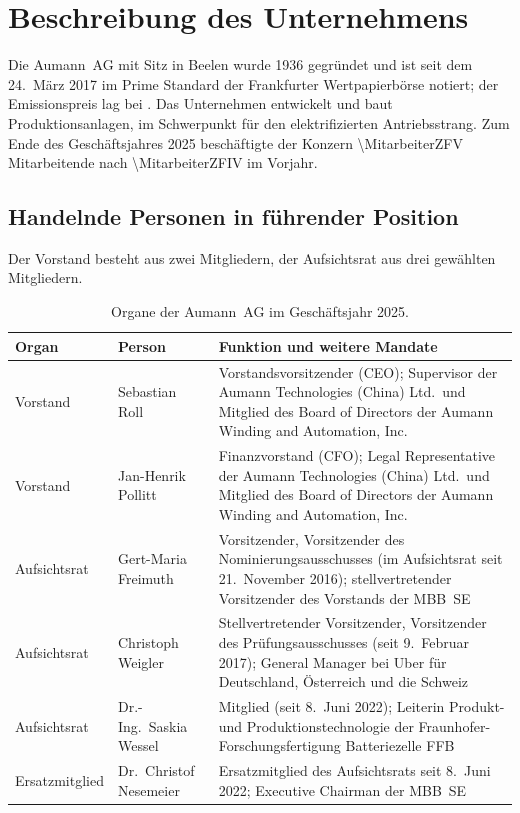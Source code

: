 \section{Beschreibung des Unternehmens}
\label{sec:unternehmen}

Die Aumann~AG mit Sitz in Beelen wurde 1936 gegr\"undet und ist seit
dem 24.~M\"arz 2017 im Prime Standard der Frankfurter Wertpapierb\"orse
notiert; der Emissionspreis lag bei
\EURje{\IPOKurs}.
Das Unternehmen entwickelt und baut Produktionsanlagen, im Schwerpunkt f\"ur
den elektrifizierten Antriebsstrang. Zum Ende des Gesch\"aftsjahres 2025
besch\"aftigte der Konzern \num{\MitarbeiterZFV} Mitarbeitende nach
\num{\MitarbeiterZFIV} im Vorjahr.

\subsection{Handelnde Personen in f\"uhrender Position}
\label{subsec:organe}

Der Vorstand besteht aus zwei Mitgliedern, der Aufsichtsrat aus drei
gew\"ahlten Mitgliedern.

\begin{table}[htbp]
\centering
\caption{Organe der Aumann~AG im Gesch\"aftsjahr 2025.}
\label{tab:organe}
\begin{tabularx}{\linewidth}{@{}llX@{}}
\toprule
\textbf{Organ} & \textbf{Person} & \textbf{Funktion und weitere Mandate}\\
\midrule
Vorstand & Sebastian Roll & Vorstandsvorsitzender (CEO); Supervisor der
  Aumann Technologies (China) Ltd.\ und Mitglied des Board of Directors der
  Aumann Winding and Automation, Inc.\\
Vorstand & Jan-Henrik Pollitt & Finanzvorstand (CFO); Legal Representative
  der Aumann Technologies (China) Ltd.\ und Mitglied des Board of Directors
  der Aumann Winding and Automation, Inc.\\
\midrule
Aufsichtsrat & Gert-Maria Freimuth & Vorsitzender, Vorsitzender des
  Nominierungsausschusses (im Aufsichtsrat seit 21.~November 2016);
  stellvertretender Vorsitzender des Vorstands der MBB~SE\\
Aufsichtsrat & Christoph Weigler & Stellvertretender Vorsitzender,
  Vorsitzender des Pr\"ufungsausschusses (seit 9.~Februar 2017); General
  Manager bei Uber f\"ur Deutschland, \"Osterreich und die Schweiz\\
Aufsichtsrat & Dr.-Ing.\ Saskia Wessel & Mitglied (seit 8.~Juni 2022);
  Leiterin Produkt- und Produktionstechnologie der
  Fraunhofer-Forschungsfertigung Batteriezelle FFB\\
\midrule
Ersatzmitglied & Dr.\ Christof Nesemeier & Ersatzmitglied des Aufsichtsrats
  seit 8.~Juni 2022; Executive Chairman der MBB~SE\\
\bottomrule
\end{tabularx}
\end{table}

